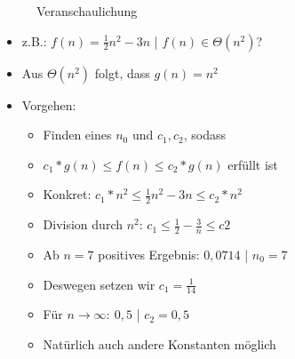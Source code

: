 \documentclass[
    ngerman,
    color=3b,
    load_common, %
    summary,
    boxarc,
]{tuda_summary}
\begin{document}
\begin{itemize}
\begin{itemize}
\begin{minipage}{0.3\textwidth}
\begin{figure}[H]
                            \caption{Veranschaulichung}
                            \label{}
                        \end{figure}
                    \end{minipage}
                    \begin{minipage}[t]{0.6\textwidth}
                        \vspace{-3cm}
                        \begin{itemize}
                            \item z.B.: $f(n)= \frac{1}{2} n^2 - 3n$ | $f(n) \in \Theta(n^2)$?
                            \item Aus $\Theta(n^2)$ folgt, dass $g(n)=n^2$
                            \item Vorgehen:
                                  \begin{itemize}
                                      \item Finden eines $n_0$ und $c_1,c_2$, sodass
                                      \item $c_1*g(n) \leq f(n) \leq c_2*g(n)$ erfüllt ist
                                      \item Konkret: $c_1*n^2 \leq \frac{1}{2} n^2 - 3n \leq c_2*n^2$
                                      \item Division durch $n^2$: $c_1 \leq \frac{1}{2}-\frac{3}{n} \leq c2$
                                      \item Ab $n=7$ positives Ergebnis: $0,0714$ | $n_0 = 7$
                                      \item Deswegen setzen wir $c_1=\frac{1}{14}$
                                      \item Für $n \rightarrow \infty: ~ 0,5$ | $c_2 = 0,5$
                                      \item Natürlich auch andere Konstanten möglich
                                  \end{itemize}
                        \end{itemize}
                    \end{minipage}
          \end{itemize}

          \pagebreak


\end{itemize}
\end{document}
